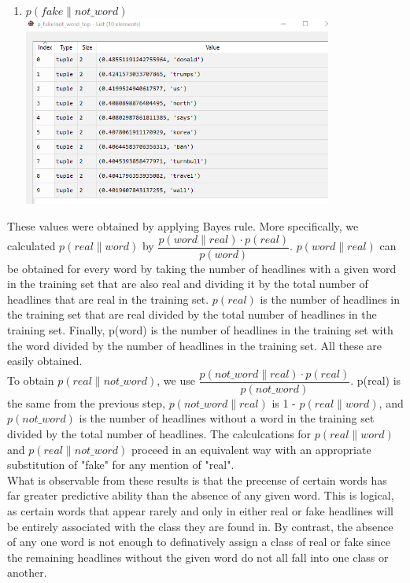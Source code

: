 \documentclass{article}
\begin{document}
\begin{enumerate}
   \item $p(fake \| not\_word)$
   \\
           \includegraphics[width=4in]{resources/part3/fakenotword}

   \end{enumerate}

   These values were obtained by applying Bayes rule. More specifically, we calculated $p(real \| word)$ by
   $ \dfrac {p(word \| real) \cdot p(real)}{p(word)}$. $p(word \| real)$ can be obtained for every word by taking
   the number of headlines with a given word in the training set that are also real and dividing it by the
   total number of headlines that are real in the training set. $p(real)$ is the number of headlines in the
   training set that are real divided by the total number of headlines in the training set. Finally, p(word) is
   the number of headlines in the training set with the word divided by the number of headlines in the training set.
   All these are easily obtained.
   \\
   To obtain $p(real \| not\_word)$, we use $ \dfrac {p(not\_word \| real) \cdot p(real)}{p(not\_word)}$. p(real)
   is the same from the previous step, $p(not\_word \| real)$ is 1 - $p(real \| word)$, and $p(not\_word)$ is the
   number of headlines without a word in the training  set divided by the total number of headlines.
   The calculcations for $p(real \| word)$ and $p(real \| not\_word)$ proceed in an equivalent way with an
   appropriate substitution of "fake" for any mention of "real".
   \\
   What is observable from these results is that the precense of certain words has far greater predictive ability
   than the absence of any given word. This is logical, as certain words that appear rarely and only in either
   real or fake headlines will be entirely associated with the class they are found in. By contrast, the
   absence of any one word is not enough to definatively assign a class of real or fake since the remaining
   headlines without the given word do not all fall into one class or another.
\end{document}
